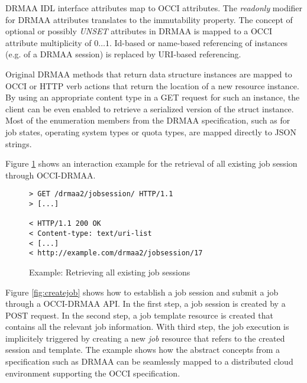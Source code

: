 \documentclass[twocolumn]{svjour3}       %
\begin{document}
DRMAA IDL interface attributes map to OCCI attributes. The \emph{readonly} modifier for DRMAA attributes translates to the immutability property. The concept of optional or possibly \emph{UNSET} attributes in DRMAA is mapped to a OCCI attribute multiplicity of $0\ldots1$. Id-based or name-based referencing of instances (e.g. of a DRMAA session) is replaced by URI-based referencing.

Original DRMAA methods that return data structure instances are mapped to OCCI or HTTP verb actions that return the location of a new resource instance. By using an appropriate content type in a GET request for such an instance, the client can be even enabled to retrieve a serialized version of the struct instance. Most of the enumeration members from the DRMAA specification, such as for job states, operating system types or quota types, are mapped directly to JSON strings. 

Figure \ref{fig:getsessions} shows an interaction example for the retrieval of all existing job session through OCCI-DRMAA.

\begin{figure}
\begin{lstlisting}
> GET /drmaa2/jobsession/ HTTP/1.1
> [...]

< HTTP/1.1 200 OK 
< Content-type: text/uri-list
< [...]
< http://example.com/drmaa2/jobsession/17
\end{lstlisting}
\caption{Example: Retrieving all existing job sessions}
\label{fig:getsessions} 
\end{figure}

Figure \ref{fig:createjob} shows how to establish a job session and submit a job through a OCCI-DRMAA API. In the first step, a job session is created by a POST request. In the second step, a job template resource is created that contains all the relevant job information. With third step, the job execution is implicitely triggered by creating a new \emph{job} resource that refers to the created session and template. The example shows how the abstract concepts from a specification such as DRMAA can be seamlessly mapped to a distributed cloud environment supporting the OCCI specification.
\end{document}
